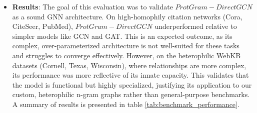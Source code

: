 \documentclass[utf8]{FrontiersinHarvard}
\begin{document}
\begin{itemize}
		\item \textbf{Results}: The goal of this evaluation was to validate $ProtGram-DirectGCN$ as a sound GNN architecture. On high-homophily citation networks (Cora, CiteSeer, PubMed), $ProtGram-DirectGCN$ underperformed relative to simpler models like GCN and GAT. This is an expected outcome, as its complex, over-parameterized architecture is not well-suited for these tasks and struggles to converge effectively. However, on the heterophilic WebKB datasets (Cornell, Texas, Wisconsin), where relationships are more complex, its performance was more reflective of its innate capacity. This validates that the model is functional but highly specialized, justifying its application to our custom, heterophilic n-gram graphs rather than general-purpose benchmarks. A summary of results is presented in table \ref{tab:benchmark_performance}.
	\end{itemize}
	
\end{document}
